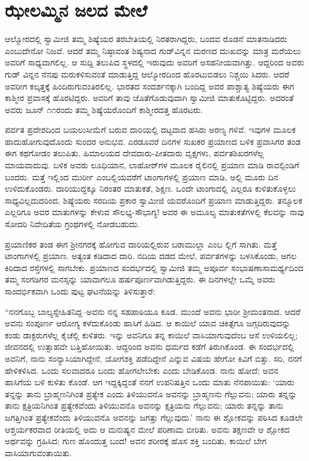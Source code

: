 
\chapter{ಝೇಲಮ್ಮಿನ ಜಲದ ಮೇಲೆ}

\noindent

ಆಲ್ಮೋರದಲ್ಲಿ ಸ್ವಾಮೀಜಿ ತಮ್ಮ ಶಿಷ್ಯೆಯರ ತರಬೇತಿಯಲ್ಲಿ ನಿರತರಾಗಿದ್ದರು, ಬಂದವ ರೊಡನೆ ಮಾತನಾಡಿದರು ಎಂಬುದೇನೋ ನಿಜವೆ. ಆದರೆ ತಮ್ಮ ನಿಷ್ಠಾವಂತ ಶಿಷ್ಯನಾದ ಗುಡ್​ವಿನ್ನನ ಮರಣದ ದುಃಖವನ್ನು ಮಾತ್ರ ಮರೆಯಲು ಅವರಿಗೆ ಸಾಧ್ಯವಾಗಲಿಲ್ಲ. ಆ ಸುದ್ದಿ ತಲುಪಿದ ಸ್ಥಳದಲ್ಲಿ ಇರುವುದು ಅವರಿಗೆ ಅಸಹನೀಯವಾಗಿತ್ತು. ಆದ್ದರಿಂದ ಅವರು ಗುಡ್ ವಿನ್ನನ ನೆನಪು ಮರುಕಳಿಸುವಂತೆ ಮಾಡುತ್ತಿದ್ದ ಆಲ್ಮೋರದಿಂದ ಹೊರಟುಬಿಡಲು ನಿಶ್ಚಯಿ ಸಿದರು. ಆದರೆ ಅವರೀಗ ಕಲ್ಕತ್ತಕ್ಕೆ ಹಿಂದಿರುಗುವಂತಿರಲಿಲ್ಲ. ಭಾರತದ ಸಂದರ್ಶನಕ್ಕಾಗಿ ಬಂದಿದ್ದ ಅವರ ಪಾಶ್ಚಾತ್ಯ ಶಿಷ್ಯೆಯರು ಈಗ ಕಾಶ್ಮೀರ ಪ್ರವಾಸಕ್ಕೆ ಹೊರಟಿದ್ದರು. ಅವರಿಗೆ ತಾವು ಜೊತೆಗೊಡುವುದಾಗಿ ಸ್ವಾಮೀಜಿ ಮಾತುಕೊಟ್ಟಿದ್ದರು. ಅದರಂತೆ ಅವರು ಜೂನ್ ೧೧ರಂದು ತಮ್ಮ ಶಿಷ್ಯೆಯರೊಂದಿಗೆ ಕಾಶ್ಮೀರದತ್ತ ಹೊರಟರು.

ಪರ್ವತ ಪ್ರದೇಶದಿಂದ ಬಯಲುಸೀಮೆಗೆ ಬರುವ ದಾರಿಯಲ್ಲಿ ದಟ್ಟವಾದ ಹಸಿರು ಅರಣ್ಯ ಗಳಿವೆ. ಇವುಗಳ ಮೂಲಕ ಹಾದುಹೋಗುವುದೊಂದು ಸುಂದರ ಅನುಭವ. ಎರಡೂವರೆ ದಿನಗಳ ಸುಖಕರ ಪ್ರಯಾಣದ ಬಳಿಕ ಪ್ರವಾಸಿಗರ ತಂಡ ಈಗ ಕಥಗೋಡಂ ತಲುಪಿತು. ಹಿಮಾಲಯದ ದೇವದಾರು-ಪೀತದಾರು ವೃಕ್ಷಗಳು, ಪರ್ವತಶಿಖರಗಳೆಲ್ಲ ಮಾಯವಾದುವು. ಬಳಿಕ ಅವರು ಲೂಧಿಯಾನ, ಲಾಹೋರ್​ಗಳ ಮೂಲಕ ರೈಲಿನಲ್ಲಿ ಪ್ರಯಾಣ ಮಾಡಿ ರಾವಲ್ಪಿಂಡಿಗೆ ಬಂದರು. ಮತ್ತೆ ಇಲ್ಲಿಂದ ಮುರ್ರೀ ಎಂಬಲ್ಲಿಯವರೆಗೆ ಟಾಂಗಾಗಳಲ್ಲಿ ಪ್ರಯಾಣ ಮಾಡಿ, ಅಲ್ಲಿ ಮೂರು ದಿನ ಉಳಿದುಕೊಂಡರು. ದಾರಿಯುದ್ದಕ್ಕೂ ನಿರಂತರ ಮಾತುಕತೆ, ಶಿಕ್ಷಣ. ಒಂದೇ ಟಾಂಗಾದಲ್ಲಿ ಎಲ್ಲರೂ ಕುಳಿತುಕೊಳ್ಳಲು ಸಾಧ್ಯವಿಲ್ಲದುದರಿಂದ, ಶಿಷ್ಯೆಯರು ಸರದಿಯ ಪ್ರಕಾರ ಸ್ವಾಮೀಜಿ ಯವರೊಂದಿಗೆ ಪ್ರಯಾಣ ಮಾಡುತ್ತಿದ್ದರು. ತನ್ಮೂಲಕ ಎಲ್ಲರಿಗೂ ಅವರ ಮಾತುಗಳನ್ನು ಕೇಳುವ ಸೌಲಭ್ಯ-ಸೌಭಾಗ್ಯ! ಅವರ ಈ ಅಮೂಲ್ಯ ಮಾತುಕತೆಗಳಲ್ಲಿ ಕೆಲವನ್ನು ನಾವು ಸೋದರಿ ನಿವೇದಿತೆಯ ಗ್ರಂಥಗಳಲ್ಲಿ ನೋಡಬಹುದು.

ಪ್ರಯಾಣಿಕರ ತಂಡ ಈಗ ಶ್ರೀನಗರಕ್ಕೆ ಹೋಗುವ ದಾರಿಯಲ್ಲಿರುವ ಬರಾಮುಲ್ಲಾ ಎಂಬ ಲ್ಲಿಗೆ ಸಾಗಿತು. ಮತ್ತೆ ಟಾಂಗಾಗಳಲ್ಲಿ ಪ್ರಯಾಣ. ಅತ್ಯಂತ ಕಡಿದಾದ ದಾರಿ. ನದಿಯ ದಡದ ಮೇಲೆ, ಪರ್ವತಗಳನ್ನು ಬಳಸಿಕೊಂಡು, ಅಗಲ ಕಿರಿದಾದ ರಸ್ತೆಗಳಲ್ಲಿ ಸಾಗಬೇಕು. ಪ್ರಯಾಣದ ಸಂದರ್ಭದಲ್ಲಿ ಸ್ವಾಮೀಜಿ ತಮ್ಮ ಅಪೂರ್ವ ಸಂಭಾಷಣಾಸಾಮರ್ಥ್ಯದಿಂದ ತಮ್ಮ ಸಂಗಡಿಗರ ಮನಸ್ಸನ್ನು ಯಾವಾಗಲೂ ಹರ್ಷಪೂರ್ಣವಾಗಿಡುತ್ತಿದ್ದರು. ಈ ದಿನಗಳಲ್ಲೇ ಒಮ್ಮೆ ಅವರು ಸಾಂದರ್ಭಿಕವಾಗಿ ಒಂದು ಪುಟ್ಟ ಘಟನೆಯನ್ನು ತಿಳಿಸುತ್ತಾರೆ:

“ನನಗೊಬ್ಬ ಬಾಲ್ಯಸ್ನೇಹಿತನಿದ್ದ–ಅವನು ನನ್ನ ಸಹಪಾಠಿಯೂ ಕೂಡ. ಮುಂದೆ ಅವನು ಭಾರೀ ಶ್ರೀಮಂತನಾದ. ಆದರೆ ಅವನು ಸಂಪೂರ್ಣ ಆರೋಗ್ಯ ಕಳೆದುಕೊಂಡು ಹಾಸಿಗೆ ಹಿಡಿದ. ಆ ಕಾಯಿಲೆ ಯಾವ ಚಿಕಿತ್ಸೆಗೂ ಜಗ್ಗದಿರುವುದನ್ನು ಕಂಡು ಡಾಕ್ಟರುಗಳೆಲ್ಲ ಕೈಚೆಲ್ಲಿ ಕುಳಿತರು. ಇನ್ನು ಅವನಿಗೂ ತನ್ನ ಕಾಯಿಲೆ ವಾಸಿಯಾಗುವುದೆಂಬ ಆಸೆ ಉಳಿಯಲಿಲ್ಲ; ಜೀವನದಲ್ಲಿ ಉತ್ಸಾಹವೇ ಬತ್ತಿಹೋಯಿತು. ಆದ್ದರಿಂದ ಅವನು ಧರ್ಮದ ಕಡೆಗೆ ತಿರುಗಿಕೊಂಡ. ಈ ಸಂದರ್ಭದಲ್ಲಿ ಅವನಿಗೆ, ನಾನು ಸಂನ್ಯಾಸಿಯಾಗಿದ್ದೇನೆ, ಯೋಗಶಕ್ತಿ ಪಡೆದಿದ್ದೇನೆ ಎನ್ನುವ ವಿಷಯ ಹೇಗೋ ಕಿವಿಗೆ ಬಿತ್ತು. ಸರಿ, ನನಗೆ ಹೇಳಿಕಳಿಸಿದ. ಒಂದು ಸಲವಾದರೂ ಬಂದು ಹೋಗಲೇಬೇಕು ಎಂದು ಬೇಡಿಕೊಂಡ. ನಾನು ಹೋದೆ; ಅವನ ಹಾಸಿಗೆಯ ಬಳಿ ಕುಳಿತು ಕೊಂಡೆ. ಆಗ ಇದ್ದಕ್ಕಿದ್ದಂತೆ ನನಗೆ ಉಪನಿಷತ್ತಿನ ಒಂದು ಮಾತು ನೆನಪಾಯಿತು: ‘ಯಾರು ತನ್ನನ್ನು ತಾನು ಬ್ರಾಹ್ಮಣನಿಗಿಂತ ಪ್ರತ್ಯೇಕ ಎಂದು ತಿಳಿಯುವನೊ ಅವನನ್ನು ಬ್ರಾಹ್ಮಣನು ಗೆಲ್ಲುವನು; ಯಾರು ತನ್ನನ್ನು ತಾನು ಕ್ಷತ್ರಿಯನಿಗಿಂತ ಪ್ರತ್ಯೇಕವೆಂದು ತಿಳಿಯುವನೊ ಅವನನ್ನು ಕ್ಷತ್ರಿಯನು ಗೆಲ್ಲುವನು; ಯಾರು ತನ್ನನ್ನು ತಾನು ಜಗತ್ತಿಗಿಂತ ಪ್ರತ್ಯೇಕವೆಂದು ತಿಳಿಯುವನೊ ಅವನನ್ನು ಜಗತ್ತು ಗೆಲ್ಲುವುದು.’ ನಾನು ಈ ಶ್ಲೋಕವನ್ನು ಪಠಿಸಿದ ಕೂಡಲೇ ಆಶ್ಚರ್ಯಕರವಾದ ರೀತಿಯಲ್ಲಿ ಅದು ಆ ಮನುಷ್ಯನ ಮೇಲೆ ಪರಿಣಾಮ ಬೀರಿತು. ಅವನು ತಕ್ಷಣವೇ ಆ ಶ್ಲೋಕದ ಅರ್ಥವನ್ನು ಗ್ರಹಿಸಿದ; ಗುಣ ಹೊಂದುತ್ತ ಬಂದ! ಅವನ ಶರೀರಕ್ಕೆ ಹೊಸ ಶಕ್ತಿ ಬಂದಿತು, ಕಾಯಿಲೆ ಬೇಗ ವಾಸಿಯಾಗುವಂತಾಯಿತು.

